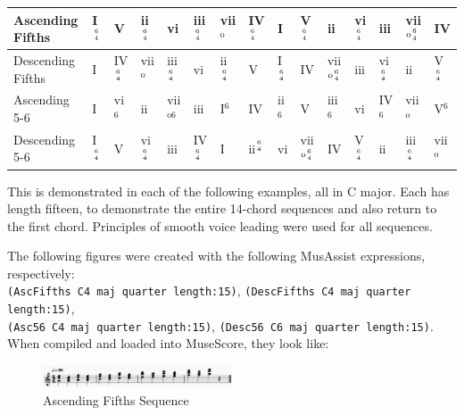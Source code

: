 \documentclass{report}
\begin{document}
\begin{table}[h!]
\begin{tabular}{|l|llllllllllllll|}
\hline
Ascending Fifths  & I$^{6 \atop 4}$ & V                & ii$^{6 \atop 4}$ & vi                & iii$^{6 \atop 4}$ & vii$^\text{o}$   & IV$^{6 \atop 4}$ & I               & V$^{6 \atop 4}$             & ii                          & vi$^{6 \atop 4}$ & iii              & vii$^{\text{o}{6 \atop 4}}$ & IV              \\ \hline
Descending Fifths & I               & IV$^{6 \atop 4}$ & vii$^\text{o}$   & iii$^{6 \atop 4}$ & vi                & ii$^{6 \atop 4}$ & V                & I$^{6 \atop 4}$ & IV                          & vii$^{\text{o}{6 \atop 4}}$ & iii              & vi$^{6 \atop 4}$ & ii                          & V$^{6 \atop 4}$ \\ \hline
Ascending 5-6     & I               & vi$^6$           & ii               & vii$^{\text{o}6}$ & iii               & I$^6$            & IV               & ii$^6$          & V                           & iii$^6$                     & vi               & IV$^6$           & vii$^\text{o}$              & V$^6$           \\ \hline
Descending 5-6    & I$^{6 \atop 4}$ & V                & vi$^{6 \atop 4}$ & iii & IV$^{6 \atop 4}$  & I                & ii$^{6 \atop 4}$ & vi              & vii$^{\text{o}{6 \atop 4}}$ & IV                          & V$^{6 \atop 4}$  & ii               & iii$^{6 \atop 4}$           & vii$^\text{o}$  \\ \hline
\end{tabular}
\end{table}

This is demonstrated in each of the following examples, all in C major. Each has length fifteen, to demonstrate the entire 14-chord sequences and also return to the first chord. Principles of smooth voice leading were used for all sequences.

The following figures were created with the following MusAssist expressions, respectively: \\\verb.(AscFifths C4 maj quarter length:15)., \verb.(DescFifths C4 maj quarter length:15)., \\\verb.(Asc56 C4 maj quarter length:15)., \verb.(Desc56 C6 maj quarter length:15).. When compiled and loaded into MuseScore, they look like:

\begin{figure}[h!]
\centering
\includegraphics[width=0.5\textwidth]{images/ascfifths}
  \caption{Ascending Fifths Sequence}
  \label{fig:ascfifths}
\end{figure}
\end{document}
